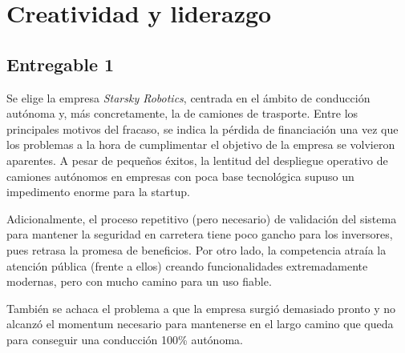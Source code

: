 \section{Creatividad y liderazgo}


\subsection{Entregable 1}

Se elige la empresa \textit{Starsky Robotics}, centrada en el ámbito de conducción autónoma y, más concretamente, la de camiones de trasporte. Entre los principales motivos del fracaso, se indica la pérdida de financiación una vez que los problemas a la hora de cumplimentar el objetivo de la empresa se volvieron aparentes. A pesar de pequeños éxitos, la lentitud del despliegue operativo de camiones autónomos en empresas con poca base tecnológica supuso un impedimento enorme para la startup.

\vspace{\baselineskip}

Adicionalmente, el proceso repetitivo (pero necesario) de validación del sistema para mantener la seguridad en carretera tiene poco gancho para los inversores, pues retrasa la promesa de beneficios. Por otro lado, la competencia atraía la atención pública (frente a ellos) creando funcionalidades extremadamente modernas, pero con mucho camino para un uso fiable.

\vspace{\baselineskip}

También se achaca el problema a que la empresa surgió demasiado pronto y no alcanzó el momentum necesario para mantenerse en el largo camino que queda para conseguir una conducción 100\% autónoma.


